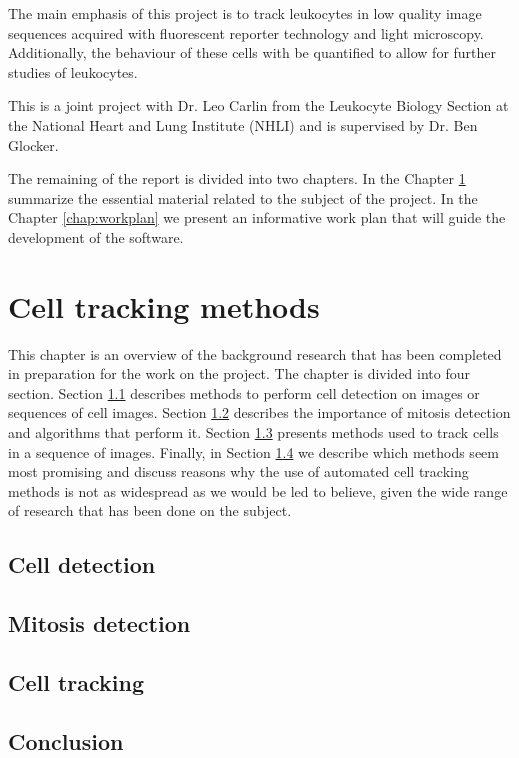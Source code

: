 \documentclass[12pt,a4paper,openany]{book}
\begin{document}
The main emphasis of this project is to track leukocytes in low quality image sequences acquired with fluorescent reporter technology and light microscopy. Additionally, the behaviour of these cells with be quantified to allow for further studies of leukocytes.

This is a joint project with Dr. Leo Carlin from the Leukocyte Biology Section at the National Heart and Lung Institute (NHLI) and is supervised by Dr. Ben Glocker.

The remaining of the report is divided into two chapters. In the Chapter \ref{chap:methodoverview} summarize the essential material related to the subject of the project. In the Chapter \ref{chap:workplan} we present an informative work plan that will guide the development of the software. 



\chapter{Cell tracking methods}
\label{chap:methodoverview}

This chapter is an overview of the background research that has been completed in preparation for the work on the project. The chapter is divided into four section. Section \ref{sec:detection} describes methods to perform cell detection on images or sequences of cell images. Section \ref{sec:mitosis} describes the importance of mitosis detection and algorithms that perform it. Section \ref{sec:tracking} presents methods used to track cells in a sequence of images. Finally, in Section \ref{sec:conclusionmethods} we describe which methods seem most promising and discuss reasons why the use of automated cell tracking methods is not as widespread as we would be led to believe, given the wide range of research that has been done on the subject.


\section{Cell detection}
\label{sec:detection}
\section{Mitosis detection}
\label{sec:mitosis}
\section{Cell tracking}
\label{sec:tracking}
\section{Conclusion}
\label{sec:conclusionmethods}
\end{document}
